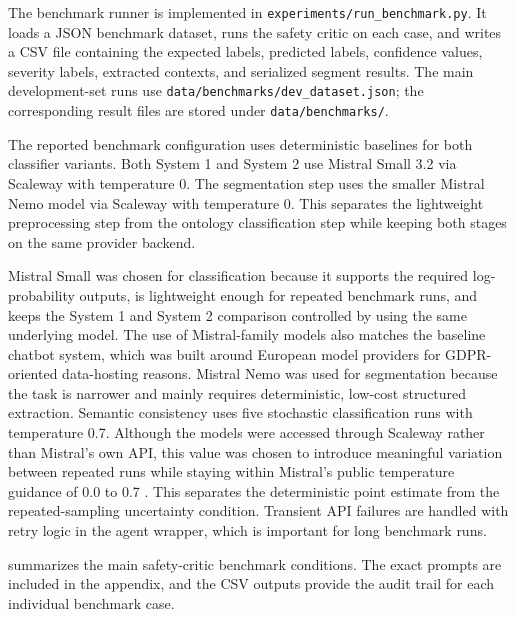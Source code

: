 The benchmark runner is implemented in \texttt{experiments/run\_benchmark.py}. It loads a JSON benchmark dataset, runs the safety critic on each case, and writes a CSV file containing the expected labels, predicted labels, confidence values, severity labels, extracted contexts, and serialized segment results. The main development-set runs use \texttt{data/benchmarks/dev\_dataset.json}; the corresponding result files are stored under \texttt{data/benchmarks/}.

The reported benchmark configuration uses deterministic baselines for both classifier variants. Both System 1 and System 2 use Mistral Small 3.2 via Scaleway with temperature 0. The segmentation step uses the smaller Mistral Nemo model via Scaleway with temperature 0. This separates the lightweight preprocessing step from the ontology classification step while keeping both stages on the same provider backend.

Mistral Small was chosen for classification because it supports the required log-probability outputs, is lightweight enough for repeated benchmark runs, and keeps the System 1 and System 2 comparison controlled by using the same underlying model. The use of Mistral-family models also matches the baseline chatbot system, which was built around European model providers for GDPR-oriented data-hosting reasons. Mistral Nemo was used for segmentation because the task is narrower and mainly requires deterministic, low-cost structured extraction. Semantic consistency uses five stochastic classification runs with temperature 0.7. Although the models were accessed through Scaleway rather than Mistral's own API, this value was chosen to introduce meaningful variation between repeated runs while staying within Mistral's public temperature guidance of 0.0 to 0.7 \parencite{mistralApiDocs}. This separates the deterministic point estimate from the repeated-sampling uncertainty condition. Transient API failures are handled with retry logic in the agent wrapper, which is important for long benchmark runs.

 summarizes the main safety-critic benchmark conditions. The exact prompts are included in the appendix, and the CSV outputs provide the audit trail for each individual benchmark case.

